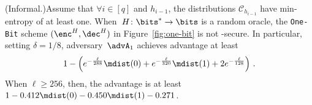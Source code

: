 \begin{theorem}(Informal.)\rm Assume that $\forall i\in[q]$ and $h_{i-1}$, 
the distributions $\mathcal{C}_{h_{i-1}}$ have min-entropy of at least one. 
When~$H\colon\bits^* \to \bits$ is a random oracle, the \texttt{One-Bit} scheme $(\enc^H,\dec^H)$ in
Figure~\ref{fig:one-bit} is not \leROD-secure.  In particular, setting $\delta=1/8$,
adversary~$\advA_1$ achieves advantage at least 
\[
1- \left(e^{-\frac{\ell}{288}}\mdist(0) + e^{-\frac{\ell}{320}}\mdist(1) + 2e^{-\frac{\ell}{128}} \right)\,.
\] 
When $\ell \geq 256$, then, the advantage is at least $1-0.412\mdist(0)-0.450\mdist(1)-0.271$.
\end{theorem}
